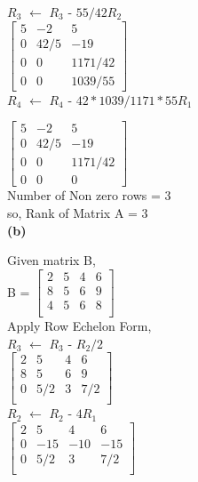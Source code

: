 \documentclass{article}
\begin{document}
$R_3$ $\leftarrow$ $R_3$ - $55/42R_2$\\

$\begin{bmatrix}
    5 & -2 & 5\\
    0 & 42/5 & -19\\
    0 & 0 & 1171/42 \\
    0 & 0 & 1039/55
    \end{bmatrix}$ \\
    
$R_4$ $\leftarrow$ $R_4$ - $42*1039/1171*55R_1$

$\begin{bmatrix}
    5 & -2 & 5\\
    0 & 42/5 & -19\\
    0 & 0 & 1171/42 \\
    0 & 0 & 0
    \end{bmatrix}$ \\

Number of Non zero rows = 3 \\

so, Rank of Matrix A = 3 \\

\textbf{(b)}

Given matrix B, \\

B = $\begin{bmatrix}
    2 & 5 & 4 & 6\\
    8 & 5 & 6 & 9\\
    4 & 5 & 6 & 8 \\
    \end{bmatrix}$ \\
    
Apply Row Echelon Form,\\

$R_3$ $\leftarrow$ $R_3$ - $R_2/2$\\

$\begin{bmatrix}
    2 & 5 & 4 & 6\\
    8 & 5 & 6 & 9\\
    0 & 5/2 & 3 & 7/2 \\
    \end{bmatrix}$ \\

$R_2$ $\leftarrow$ $R_2$ - $4R_1$\\

$\begin{bmatrix}
    2 & 5 & 4 & 6\\
    0 & -15 & -10 & -15\\
    0 & 5/2 & 3 & 7/2 \\
    \end{bmatrix}$ \\
    
\end{document}
